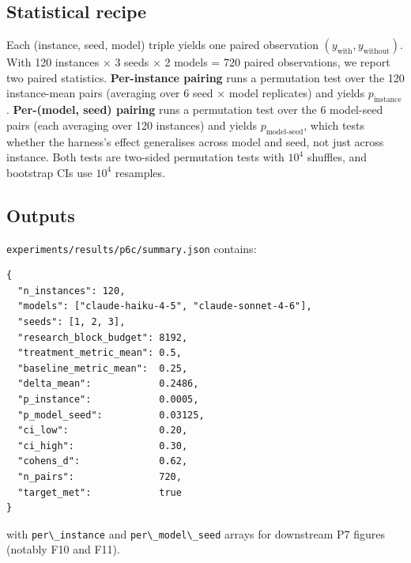 \subsection{Statistical recipe}\label{statistical-recipe}

Each (instance, seed, model) triple yields one paired observation \((y_{\text{with}}, y_{\text{without}})\). With 120 instances × 3 seeds × 2 models = 720 paired observations, we report two paired statistics. \textbf{Per-instance pairing} runs a permutation test over the 120 instance-mean pairs (averaging over 6 seed × model replicates) and yields \(p_{\text{instance}}\). \textbf{Per-(model, seed) pairing} runs a permutation test over the 6 model-seed pairs (each averaging over 120 instances) and yields \(p_{\text{model-seed}}\), which tests whether the harness's effect generalises across model and seed, not just across instance. Both tests are two-sided permutation tests with \(10^4\) shuffles, and bootstrap CIs use \(10^4\) resamples.

\subsection{Outputs}\label{outputs}

\passthrough{\lstinline!experiments/results/p6c/summary.json!} contains:

\begin{lstlisting}
{
  "n_instances": 120,
  "models": ["claude-haiku-4-5", "claude-sonnet-4-6"],
  "seeds": [1, 2, 3],
  "research_block_budget": 8192,
  "treatment_metric_mean": 0.5,
  "baseline_metric_mean":  0.25,
  "delta_mean":            0.2486,
  "p_instance":            0.0005,
  "p_model_seed":          0.03125,
  "ci_low":                0.20,
  "ci_high":               0.30,
  "cohens_d":              0.62,
  "n_pairs":               720,
  "target_met":            true
}
\end{lstlisting}

with \passthrough{\lstinline!per\_instance!} and \passthrough{\lstinline!per\_model\_seed!} arrays for downstream P7 figures (notably F10 and F11).
